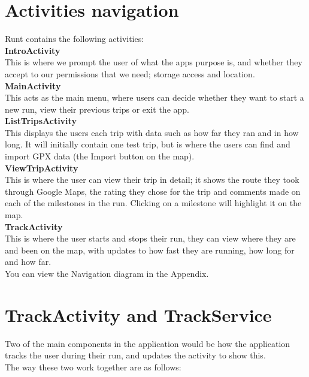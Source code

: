 \documentclass[11pt]{article}
\begin{document}
\newpage
\section{Activities navigation}

Runt contains the following activities: \\

\textbf{IntroActivity}\\
This is where we prompt the user of what the apps purpose is, and whether they accept to our permissions that we need; storage access and location. \\

\textbf{MainActivity} \\
This acts as the main menu, where users can decide whether they want to start a new run, view their previous trips or exit the app. \\

\textbf{ListTripsActivity} \\
This displays the users each trip with data such as how far they ran and in how long. It will initially contain one test trip, but is where the users can find and import GPX data (the Import button on the map).\\

\textbf{ViewTripActivity} \\
This is where the user can view their trip in detail; it shows the route they took through Google Maps, the rating they chose for the trip and comments made on each of the milestones in the run. Clicking on a milestone will highlight it on the map. \\

\textbf{TrackActivity} \\
This is where the user starts and stops their run, they can view where they are and been on the map, with updates to how fast they are running, how long for and how far.\\

You can view the Navigation diagram in the Appendix.


\newpage

\section{TrackActivity and TrackService}

Two of the main components in the application would be how the application tracks the user during their run, and updates the activity to show this.  \\
The way these two work together are as follows: \\
\end{document}
